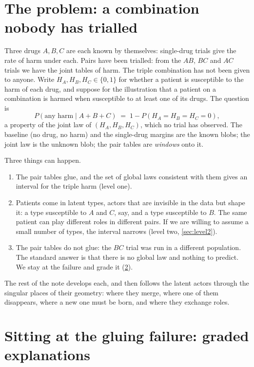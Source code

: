 \documentclass[11pt]{article}
\theoremstyle{definition}\newtheorem{definition}[theorem]{Definition}\newtheorem{remark}[theorem]{Remark}\newtheorem{example}[theorem]{Example}
\begin{document}
\section{The problem: a combination nobody has trialled}\label{sec:problem}

Three drugs $A,B,C$ are each known by themselves: single-drug trials give the rate of harm under each. Pairs have been trialled: from the
$AB$, $BC$ and $AC$ trials we have the joint tables of harm. The triple combination has not been given to anyone. Write $H_A,H_B,H_C\in
\{0,1\}$ for whether a patient is susceptible to the harm of each drug, and suppose for the illustration that a patient on a combination
is harmed when susceptible to at least one of its drugs. The question is
\[
  P(\text{any harm}\mid A{+}B{+}C) \;=\; 1-P(H_A=H_B=H_C=0),
\]
a property of the joint law of $(H_A,H_B,H_C)$, which no trial has observed. The baseline (no drug, no harm) and the single-drug margins are
the known blobs; the joint law is the unknown blob; the pair tables are \emph{windows} onto it.

Three things can happen.
\begin{enumerate}[leftmargin=*,itemsep=2pt]
\item The pair tables glue, and the set of global laws consistent with them gives an interval for the triple harm (level one).
\item Patients come in latent types, actors that are invisible in the data but shape it: a type susceptible to $A$ and $C$, say, and a
type susceptible to $B$. The same patient can play different roles in different pairs. If we are willing to assume a small number of types,
the interval narrows (level two, \cref{sec:level2}).
\item The pair tables do not glue: the $BC$ trial was run in a different population. The standard answer is that there is no global
law and nothing to predict. We stay at the failure and grade it (\cref{sec:graded}).
\end{enumerate}
The rest of the note develops each, and then follows the latent actors through the singular places of their geometry: where they merge,
where one of them disappears, where a new one must be born, and where they exchange roles.

\section{Sitting at the gluing failure: graded explanations}\label{sec:graded}
\end{document}
